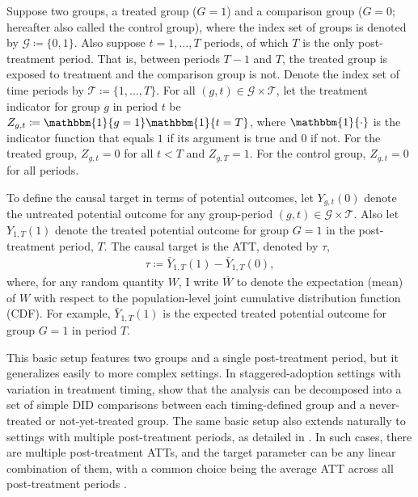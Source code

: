 \documentclass[twoside,11pt]{article}
\begin{document}
Suppose two groups, a treated group ($G = 1$) and a comparison group ($G = 0$; hereafter also called the control group), where the index set of groups is denoted by $\mathcal{G} \coloneqq \{0, 1\}$. Also suppose $t = 1, \ldots , T$ periods, of which $T$ is the only post-treatment period. That is, between periods $T - 1$ and $T$, the treated group is exposed to treatment and the comparison group is not. Denote the index set of time periods by $\mathcal{T} \coloneqq \{1, \ldots , T\}$. For all $(g,t) \in \mathcal{G} \times \mathcal{T}$, let the treatment indicator for group $g$ in period $t$ be $Z_{g,t} \coloneqq \mathbbm{1}\{g = 1\} \mathbbm{1}\{t = T\}$, where $\mathbbm{1}\{\cdot\}$ is the indicator function that equals $1$ if its argument is true and $0$ if not. For the treated group, $Z_{g,t} = 0$ for all $t < T$ and $Z_{g,T} = 1$. For the control group, $Z_{g,t} = 0$ for all periods.

To define the causal target in terms of potential outcomes, let $Y_{g,t}(0)$ denote the untreated potential outcome for any group-period $(g,t) \in \mathcal{G} \times \mathcal{T}$. Also let $Y_{1,T}(1)$ denote the treated potential outcome for group $G = 1$ in the post-treatment period, $T$. The causal target is the ATT, denoted by $\tau$,
\begin{align} \label{eq: ATT I}
\tau \coloneqq \bar{Y}_{1,T}(1) - \bar{Y}_{1,T}(0),
\end{align} 
where, for any random quantity $W$, I write $\bar{W}$ to denote the expectation (mean) of $W$ with respect to the population-level joint cumulative distribution function (CDF). For example, $\bar{Y}_{1,T}(1)$ is the expected treated potential outcome for group $G = 1$ in period $T$.

This basic setup features two groups and a single post-treatment period, but it generalizes easily to more complex settings. In staggered-adoption settings with variation in treatment timing, \citet{callawaysantanna2021} show that the analysis can be decomposed into a set of simple DID comparisons between each timing-defined group and a never-treated or not-yet-treated group. The same basic setup also extends naturally to settings with multiple post-treatment periods, as detailed in . In such cases, there are multiple post-treatment \textrm{ATT}s, and the target parameter can be any linear combination of them, with a common choice being the average \textrm{ATT} across all post-treatment periods \citep[][p.~2561]{rambachanroth2023}.
\end{document}
